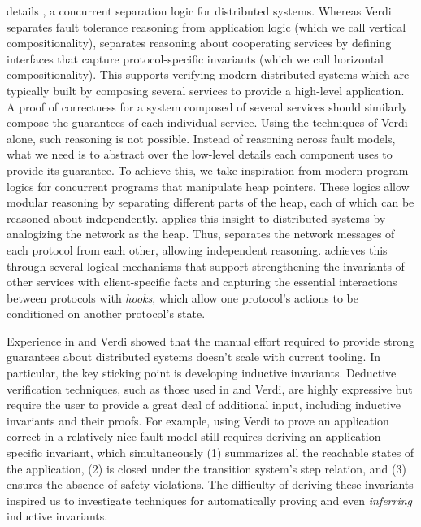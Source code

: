  details \disel,
  a concurrent separation logic for distributed systems.
Whereas
  Verdi separates fault tolerance reasoning from application logic
  (which we call vertical compositionality),
  \disel separates reasoning about cooperating services
  by defining interfaces that capture protocol-specific invariants
  (which we call horizontal compositionality).
This supports verifying modern distributed systems
  which are typically built by composing several services
  to provide a high-level application.
A proof of correctness for a system composed of several services
  should similarly compose the guarantees of each individual service.
Using the techniques of Verdi alone,
  such reasoning is not possible.
Instead of reasoning across fault models,
  what we need is
  to abstract over the low-level details
  each component uses to provide its guarantee.
To achieve this, we take inspiration
  from modern program logics for concurrent programs
  that manipulate heap pointers.
These logics allow modular reasoning
  by separating different parts of the heap,
  each of which can be reasoned about independently.
\disel applies this insight to distributed systems
  by analogizing the network as the heap.
Thus, \disel separates the network messages
  of each protocol from each other,
  allowing independent reasoning.
\disel achieves this through several logical mechanisms
  that support strengthening the invariants
  of other services with client-specific facts and
  capturing the essential interactions
  between protocols with \emph{hooks},
  which allow one protocol's actions
  to be conditioned on another protocol's state.

Experience in \disel and Verdi showed
  that the manual effort required
  to provide strong guarantees about distributed systems
  doesn't scale with current tooling.
In particular, the key sticking point is developing inductive invariants.
Deductive verification techniques,
  such as those used in \disel and Verdi,
  are highly expressive
  but require the user to provide a great deal of additional input,
  including inductive invariants and their proofs.
For example, using Verdi to prove an application correct
  in a relatively nice fault model
  still requires deriving an application-specific invariant,
  which simultaneously
    (1) summarizes all the reachable states of the application,
    (2) is closed under the transition system's step relation, and
    (3) ensures the absence of safety violations.
The difficulty of deriving these invariants
  inspired us to investigate techniques
  for automatically proving and even \emph{inferring} inductive invariants.


